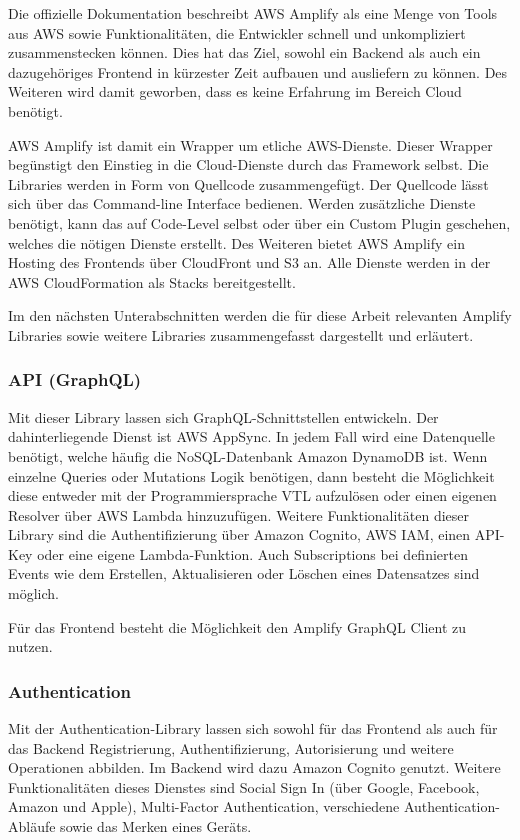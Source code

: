 Die offizielle Dokumentation beschreibt \ac{AWS} Amplify als eine Menge von Tools aus \ac{AWS} sowie Funktionalitäten, die Entwickler schnell und unkompliziert zusammenstecken können. Dies hat das Ziel, sowohl ein Backend als auch ein dazugehöriges Frontend in kürzester Zeit aufbauen und ausliefern zu können. Des Weiteren wird damit geworben, dass es keine Erfahrung im Bereich Cloud benötigt.

\ac{AWS} Amplify ist damit ein Wrapper um etliche \ac{AWS}-Dienste. Dieser Wrapper begünstigt den Einstieg in die Cloud-Dienste durch das Framework selbst. Die Libraries werden in Form von Quellcode zusammengefügt. Der Quellcode lässt sich über das Command-line Interface bedienen. Werden zusätzliche Dienste benötigt, kann das auf Code-Level selbst oder über ein Custom Plugin geschehen, welches die nötigen Dienste erstellt. Des Weiteren bietet \ac{AWS} Amplify ein Hosting des Frontends über CloudFront und S3 an. Alle Dienste werden in der \ac{AWS} CloudFormation als Stacks bereitgestellt.

Im den nächsten Unterabschnitten werden die für diese Arbeit relevanten Amplify Libraries sowie weitere Libraries zusammengefasst dargestellt und erläutert.

\subsubsection{API (GraphQL)}

Mit dieser Library lassen sich GraphQL-Schnittstellen entwickeln. Der dahinterliegende Dienst ist \ac{AWS} AppSync. In jedem Fall wird eine Datenquelle benötigt, welche häufig die NoSQL-Datenbank Amazon DynamoDB ist. Wenn einzelne Queries oder Mutations Logik benötigen, dann besteht die Möglichkeit diese entweder mit der Programmiersprache VTL aufzulösen oder einen eigenen Resolver über \ac{AWS} Lambda hinzuzufügen. Weitere Funktionalitäten dieser Library sind die Authentifizierung über Amazon Cognito, \ac{AWS} IAM, einen API-Key oder eine eigene Lambda-Funktion. Auch Subscriptions bei definierten Events wie dem Erstellen, Aktualisieren oder Löschen eines Datensatzes sind möglich.

Für das Frontend besteht die Möglichkeit den Amplify GraphQL Client zu nutzen.

\subsubsection{Authentication}

Mit der Authentication-Library lassen sich sowohl für das Frontend als auch für das Backend Registrierung, Authentifizierung, Autorisierung und weitere Operationen abbilden. Im Backend wird dazu Amazon Cognito genutzt. Weitere Funktionalitäten dieses Dienstes sind Social Sign In (über Google, Facebook, Amazon und Apple), Multi-Factor Authentication, verschiedene Authentication-Abläufe sowie das Merken eines Geräts.

